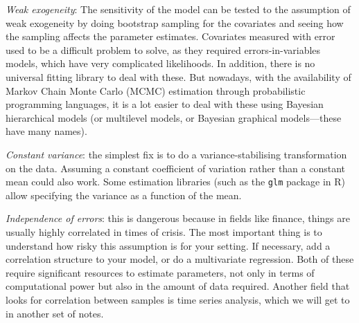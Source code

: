 \textit{Weak exogeneity}: The sensitivity of the model can be tested to the assumption of weak exogeneity by doing bootstrap sampling for the covariates and seeing how the sampling affects the parameter estimates. Covariates measured with error used to be a difficult problem to solve, as they required errors-in-variables models, which have very complicated likelihoods. In addition, there is no universal fitting library to deal with these. But nowadays, with the availability of Markov Chain Monte Carlo (MCMC) estimation through probabilistic programming languages, it is a lot easier to deal with these using Bayesian hierarchical models (or multilevel models, or Bayesian graphical models---these have many names).

\textit{Constant variance}: the simplest fix is to do a variance-stabilising transformation on the data. Assuming a constant coefficient of variation rather than a constant mean could also work. Some estimation libraries (such as the \verb+glm+ package in R) allow specifying the variance as a function of the mean.

\textit{Independence of errors}: this is dangerous because in fields like finance, things are usually highly correlated in times of crisis. The most important thing is to understand how risky this assumption is for your setting. If necessary, add a correlation structure to your model, or do  a multivariate regression. Both of these require significant resources to estimate parameters, not only in terms of computational power but also in the amount of data required. Another field that looks for correlation between samples is time series analysis, which we will get to in another set of notes. 

